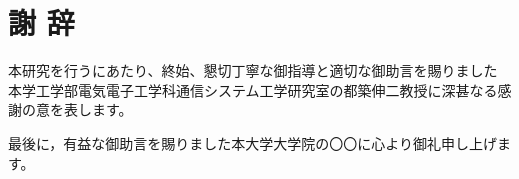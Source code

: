\chapter*{謝 辞}

本研究を行うにあたり、終始、懇切丁寧な御指導と適切な御助言を賜りました
本学工学部電気電子工学科通信システム工学研究室の都築伸二教授に深甚なる感謝の意を表します。

最後に，有益な御助言を賜りました本大学大学院の〇〇に心より御礼申し上げます。
